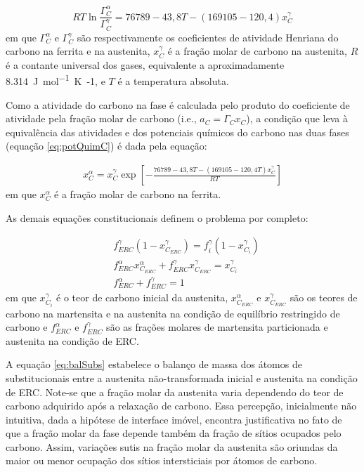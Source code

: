 \begin{equation}
  RT \ln\frac{\Gamma_C^\alpha}{\Gamma_C^\gamma} = 76789 - 43,8T - (169105 - 120,4) x_C^\gamma
  \label{eq:ativC}
\end{equation}
%
em que $\Gamma_C^\alpha$ e $\Gamma_C^\gamma$ são respectivamente os coeficientes de atividade Henriana do carbono na ferrita e na austenita, $x_C^\gamma$ é a fração molar de carbono na austenita, $R$ é a contante universal dos gases, equivalente a aproximadamente \SI{8.314}{J mol^{-1} K{-1}}, e $T$ é a temperatura absoluta.


Como a atividade do carbono na fase é calculada pelo produto do coeficiente de atividade pela fração molar de carbono (i.e., $a_C = \Gamma_C x_C$), a condição que leva à equivalência das atividades e dos potenciais químicos do carbono nas duas fases (equação \ref{eq:potQuimC}) é dada pela equação:

\begin{subequations}
  \begin{align}
    x_C^\alpha = x_C^\gamma \exp \left [ - \frac{76789 - 43,8T - (169105 - 120,4T) x_C^\gamma}{RT} \right ]\label{eq:ativC2}
  \end{align}
\end{subequations}
%
em que $x_C^\alpha$ é a fração molar de carbono na ferrita.

As demais equações constitucionais definem o problema por completo:

\begin{subequations}[resume]
  \begin{align}
    &f_{ERC}^\gamma \left ( 1 - x_{C_{ERC}}^\gamma \right ) = f_i^\gamma \left ( 1 - x_{C_i}^\gamma \right )\label{eq:balSubs}\\
    &f_{ERC}^\alpha x_{C_{ERC}}^\alpha + f_{ERC}^\gamma x_{C_{ERC}}^\gamma = x_{C_i}^\gamma\label{eq:balC}\\
    &f_{ERC}^\alpha + f_{ERC}^\gamma = 1\label{eq:balFases}
  \end{align}
\end{subequations}
%
em que $x_{C_i}^\gamma$ é o teor de carbono inicial da austenita, $x_{C_{ERC}}^\alpha$ e $x_{C_{ERC}}^\gamma$ são os teores de carbono na martensita e na austenita na condição de equilíbrio restringido de carbono e $f_{ERC}^\alpha$ e $f_{ERC}^\gamma$ são as frações molares de martensita particionada e austenita na condição de ERC.

A equação \ref{eq:balSubs} estabelece o balanço de massa dos átomos de substitucionais entre a austenita não-transformada inicial e austenita na condição de ERC. Note-se que a fração molar da austenita varia dependendo do teor de carbono adquirido após a relaxação de carbono. Essa percepção, inicialmente não intuitiva, dada a hipótese de interface imóvel, encontra justificativa no fato de que a fração molar da fase depende também da fração de sítios ocupados pelo carbono. Assim, variações sutis na fração molar da austenita são oriundas da maior ou menor ocupação dos sítios intersticiais por átomos de carbono.

